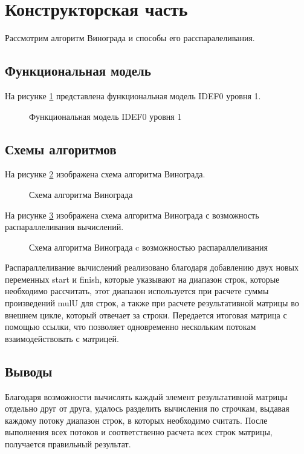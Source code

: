 \newpage
\section{Конструкторская часть}

Рассмотрим алгоритм Винограда и способы его расспаралеливания.

\subsection{Функциональная модель}

На рисунке \ref{img:idef0} представлена функциональная модель IDEF0 уровня 1.

\begin{figure}[H]
    \caption{Функциональная модель IDEF0 уровня 1}
    \label{img:idef0}
\end{figure}

\subsection{Схемы алгоритмов}

На рисунке \ref{img:modvinograd} изображена схема
алгоритма Винограда.

\begin{figure}[H]
    \caption{Схема алгоритма Винограда}
    \label{img:modvinograd}
\end{figure}

На рисунке \ref{img:modvinograd-thread} изображена схема
алгоритма Винограда с возможность распараллеливания вычислений.

\begin{figure}[H]
    \caption{Схема алгоритма Винограда c возможностью распараллеливания}
    \label{img:modvinograd-thread}
\end{figure}

Распараллеливание вычислений реализовано благодаря добавлению двух новых переменных
{\ttfamily start} и {\ttfamily finish}, которые указывают на диапазон строк, которые
необходимо рассчитать, этот диапазон используется при расчете суммы произведений
{\ttfamily mulU} для строк, а также при расчете результативной матрицы во внешнем цикле, который
отвечает за строки. Передается итоговая матрица с помощью ссылки, что позволяет
одновременно нескольким потокам взаимодействовать с матрицей.

\subsection{Выводы}

Благодаря возможности вычислять каждый элемент результативной матрицы отдельно друг от друга,
удалось разделить вычисления по строчкам, выдавая каждому потоку диапазон строк, в которых
необходимо считать. После выполнения всех потоков и соответственно расчета всех строк матрицы,
получается правильный результат.
